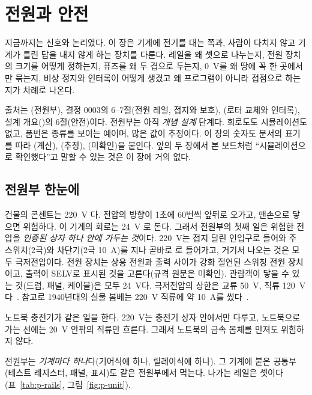\chapter{전원과 안전}\label{ch:44-power-safety}

지금까지는 신호와 논리였다. 이 장은 기계에 전기를 대는 쪽과, 사람이 다치지 않고 기계가 틀린 답을 내지 않게 하는
장치를 다룬다. 레일을 왜 셋으로 나누는지, 전원 장치의 크기를 어떻게 정하는지, 퓨즈를 왜 두 겹으로 두는지, 0~V를
왜 땅에 꼭 한 곳에서만 묶는지, 비상 정지와 인터록이 어떻게 생겼고 왜 프로그램이 아니라 접점으로 하는지가 차례로
나온다.

출처는 (전원부), 결정 0003의 6--7절(전원 레일, 접지와 보호),
(로터 교체와 인터록), 설계 개요()의 6절(안전)이다. 전원부는
아직 \emph{개념 설계} 단계다. 회로도도 시뮬레이션도 없고, 품번은 종류를 보이는 예이며, 많은 값이 추정이다. 이 장의
숫자도 문서의 표기를 따라 (계산), (추정), (미확인)을 붙인다. 앞의 두 장에서 본 보드처럼 ``시뮬레이션으로 확인했다''고 말할
수 있는 것은 이 장에 거의 없다.

\section{전원부 한눈에}\label{sec:p-overview}

\Why 건물의 콘센트는 220~V 다. 전압의 방향이 1초에 60번씩 앞뒤로 오가고, 맨손으로 닿으면 위험하다. 이 기계의
회로는 24~V 로 돈다. 그래서 전원부의 첫째 일은 위험한 전압을 \emph{인증된 상자 하나 안에 가두는 것}이다.
220~V는 접지 달린 인입구로 들어와 주 스위치(2극)와 차단기(2극 10~A)를 지나 곧바로 로 들어가고, 거기서 나오는 것은 모두 극저전압이다. 전원 장치는 상용 전원과 출력 사이가 강화 절연된 스위칭 전원
장치이고, 출력이 SELV로 표시된 것을 고른다(규격 원문은 미확인). 관람객이 닿을 수 있는 것(드럼, 패널, 케이블)은 모두
24~V다. 극저전압의 상한은 교류 50~V, 직류 120~V다~\cite{iec61140}. 참고로 1940년대의 실물 봄베는 220~V 직류에 약
10~A를 썼다~\cite{us6812report1944}.

\General 노트북 충전기가 같은 일을 한다. 220~V는 충전기 상자 안에서만 다루고, 노트북으로 가는 선에는 20~V 안팎의 직류만
흐른다. 그래서 노트북의 금속 몸체를 만져도 위험하지 않다.

\Ours 전원부는 \emph{기계마다 하나}다(기어식에 하나, 릴레이식에 하나). 그 기계에 붙은 공통부(테스트 레지스터, 패널,
표시)도 같은 전원부에서 먹는다. 나가는 레일은 셋이다(표~\ref{tab:p-rails}, 그림~\ref{fig:p-unit}).

